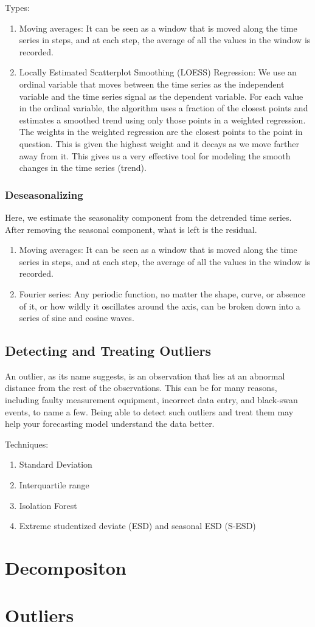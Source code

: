 \documentclass{article}
\begin{document}
Types:
\begin{enumerate}
    \item Moving averages: It can
    be seen as a window that is moved along the time series in steps, and at each step, the average of all
    the values in the window is recorded.
    \item Locally Estimated Scatterplot Smoothing (LOESS) Regression: We use an ordinal variable that moves between the time series as the independent
    variable and the time series signal as the dependent variable. For each value in the ordinal variable,
    the algorithm uses a fraction of the closest points and estimates a smoothed trend using only those
    points in a weighted regression. The weights in the weighted regression are the closest points to the
    point in question. This is given the highest weight and it decays as we move farther away from it. This
    gives us a very effective tool for modeling the smooth changes in the time series (trend).
\end{enumerate}

\subsubsection{Deseasonalizing}
Here, we estimate the seasonality component from the detrended time series.
After removing the seasonal component, what is left is the residual.

\begin{enumerate}
    \item Moving averages: It can
    be seen as a window that is moved along the time series in steps, and at each step, the average of all
    the values in the window is recorded.
    \item Fourier series: Any periodic function, no matter the shape, curve, or
    absence of it, or how wildly it oscillates around the axis, can be broken down into a series of sine and
    cosine waves.
\end{enumerate}

\subsection{Detecting and Treating Outliers}
An outlier, as its name suggests, is an observation that lies at an abnormal distance from
the rest of the observations. This can be for many reasons, including faulty measurement
equipment, incorrect data entry, and black-swan events, to name a few. Being able to detect such
outliers and treat them may help your forecasting model understand the data better.

Techniques:
\begin{enumerate}
    \item Standard Deviation
    \item Interquartile range
    \item Isolation Forest 
    \item Extreme studentized deviate (ESD) and seasonal ESD (S-ESD)
\end{enumerate}

\section{Decompositon}
\section{Outliers}
\end{document}

